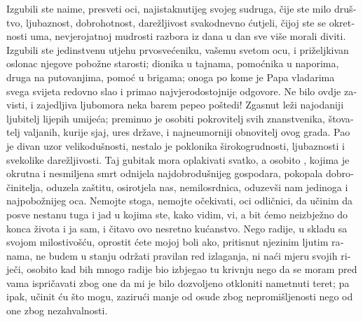 \documentclass[a5paper,twoside]{article}
\begin{document}
\begin{pages}
\begin{Rightside}
\begin{croatian}
\pend
\pstart
Izgubili ste naime, presveti oci, najistaknutijeg svojeg sudruga, čije ste milo društvo, ljubaznost, dobrohotnost, darežljivost svakodnevno ćutjeli, čijoj ste se okretnosti uma, nevjerojatnoj mudrosti razbora iz dana u dan sve više morali diviti.  Izgubili ste jedinstvenu utjehu prvosvećeniku, vašemu svetom ocu, i priželjkivan oslonac njegove pobožne starosti; dionika u tajnama, pomoćnika u naporima, druga na putovanjima, pomoć u brigama; onoga po kome je Papa vladarima svega svijeta redovno slao i primao najvjerodostojnije odgovore.  Ne bilo ovdje zavisti, i zajedljiva ljubomora neka barem pepeo poštedi! Zgasnut leži najodaniji ljubitelj lijepih umijeća; preminuo je osobiti pokrovitelj svih znanstvenika, štovatelj valjanih, kurije sjaj, ures države, i najneumorniji obnovitelj ovog grada. Pao je divan uzor velikodušnosti, nestalo je poklonika širokogrudnosti, ljubaznosti i svekolike darežljivosti.  Taj gubitak mora oplakivati svatko, a osobito , kojima je okrutna i nesmiljena smrt odnijela najdobrodušnijeg gospodara, pokopala dobročinitelja, oduzela zaštitu, osirotjela nas, nemilosrdnica, oduzevši nam jedinoga i najpobožnijeg oca.  Nemojte stoga, nemojte očekivati, oci odličnici, da učinim da posve nestanu tuga i jad u kojima ste, kako vidim, vi, a bit ćemo neizbježno do konca života i ja sam, i čitavo ovo nesretno kućanstvo.  Nego radije, u skladu sa svojom milostivošću, oprostit ćete mojoj boli ako, pritisnut njezinim ljutim ranama, ne budem u stanju održati pravilan red izlaganja, ni naći mjeru svojih riječi, osobito kad bih mnogo radije bio izbjegao tu krivnju nego da se moram pred vama ispričavati zbog one da mi je bilo dozvoljeno otkloniti nametnuti teret; pa ipak, učinit ću što mogu, zazirući manje od osude zbog nepromišljenosti nego od one zbog nezahvalnosti.


\end{croatian}
\end{Rightside}
\end{pages}
\end{document}
